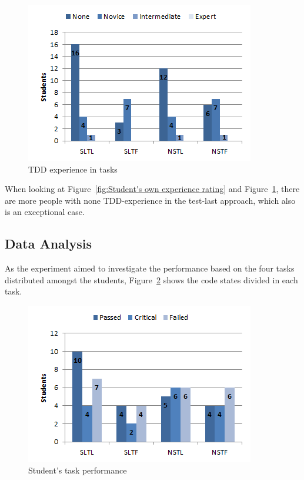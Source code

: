 \documentclass{sig-alternate-05-2015}
\begin{document}
\begin{figure}[!ht]
	\centering
	\includegraphics[width=1\linewidth]{img04}
	\caption{TDD experience in tasks}
	\label{fig:TDD experience in tasks}
\end{figure}

When looking at Figure~\ref{fig:Student's own experience rating} and Figure~\ref{fig:TDD experience in tasks}, there are more people with none TDD-experience in the test-last approach, which also is an exceptional case.

\subsection{Data Analysis}
\label{DataAnalysis}
As the experiment aimed to investigate the performance based on the four tasks distributed amongst the students, Figure~\ref{fig:Student's task performance} shows the code states divided in each task.

\begin{figure}[!ht]
	\centering
	\includegraphics[width=1\linewidth]{img05}
	\caption{Student's task performance}
	\label{fig:Student's task performance}
\end{figure}
\end{document}
